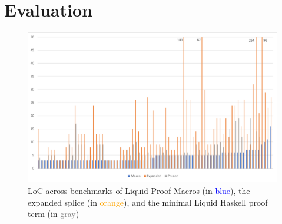 \section{Evaluation}

\begin{figure}
  \includegraphics[width=\textwidth]{LiquidProofEval.png}
  \caption{LoC across benchmarks of Liquid Proof Macros (in \textcolor{blue}{blue}), the expanded splice (in \textcolor{orange}{orange}), and the minimal
    Liquid Haskell proof term (in \textcolor{gray}{gray})}
  \label{fig:loc-eval}
\end{figure}




